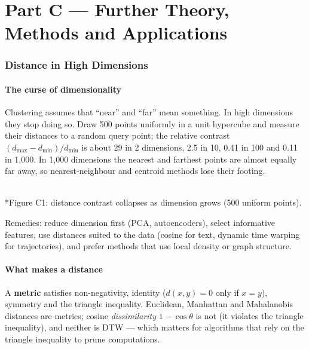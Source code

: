 \documentclass[11pt]{article}
\begin{document}
\clearpage
\part*{Part C --- Further Theory, Methods and Applications}

\section{Distance in High Dimensions}
\subsection{The curse of dimensionality}
Clustering assumes that ``near'' and ``far'' mean something. In high dimensions they stop doing so. Draw 500 points uniformly in a unit hypercube and measure their distances to a random query point; the relative contrast $(d_{\max}-d_{\min})/d_{\min}$ is about 29 in 2 dimensions, 2.5 in 10, 0.41 in 100 and 0.11 in 1,000. In 1,000 dimensions the nearest and farthest points are almost equally far away, so nearest-neighbour and centroid methods lose their footing.
\begin{center}\\*{\small\color{GreyN}Figure C1: distance contrast collapses as dimension grows (500 uniform points).}\end{center}
Remedies: reduce dimension first (PCA, autoencoders), select informative features, use distances suited to the data (cosine for text, dynamic time warping for trajectories), and prefer methods that use local density or graph structure.
\subsection{What makes a distance}
A \textbf{metric} satisfies non-negativity, identity ($d(x,y)=0$ only if $x=y$), symmetry and the triangle inequality. Euclidean, Manhattan and Mahalanobis distances are metrics; cosine \emph{dissimilarity} $1-\cos\theta$ is not (it violates the triangle inequality), and neither is DTW --- which matters for algorithms that rely on the triangle inequality to prune computations.
\end{document}

